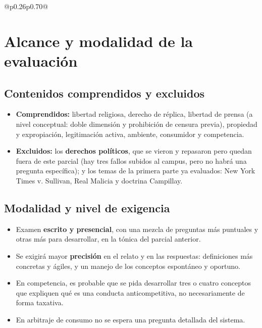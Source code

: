\documentclass[12pt,oneside]{book}
\begin{document}
\begin{longtable}{@{}p{}p{}@{}}
\midrule
{} \\
\bottomrule
\end{longtable}

\chapter{Alcance y modalidad de la evaluación}

\section{Contenidos comprendidos y excluidos}

\begin{itemize}
    \item \textbf{Comprendidos:} libertad religiosa, derecho de réplica, libertad de prensa (a nivel conceptual: doble dimensión y prohibición de censura previa), propiedad y expropiación, legitimación activa, ambiente, consumidor y competencia.
    \item \textbf{Excluidos:} los \textbf{derechos políticos}, que se vieron y repasaron pero quedan fuera de este parcial (hay tres fallos subidos al campus, pero no habrá una pregunta específica); y los temas de la primera parte ya evaluados: New York Times v. Sullivan, Real Malicia y doctrina Campillay.
\end{itemize}

\section{Modalidad y nivel de exigencia}

\begin{itemize}
    \item Examen \textbf{escrito y presencial}, con una mezcla de preguntas más puntuales y otras más para desarrollar, en la tónica del parcial anterior.
    \item Se exigirá mayor \textbf{precisión} en el relato y en las respuestas: definiciones más concretas y ágiles, y un manejo de los conceptos espontáneo y oportuno.
    \item En competencia, es probable que se pida desarrollar tres o cuatro conceptos que expliquen qué es una conducta anticompetitiva, no necesariamente de forma taxativa.
    \item En arbitraje de consumo no se espera una pregunta detallada del sistema.
\end{itemize}
\end{document}
